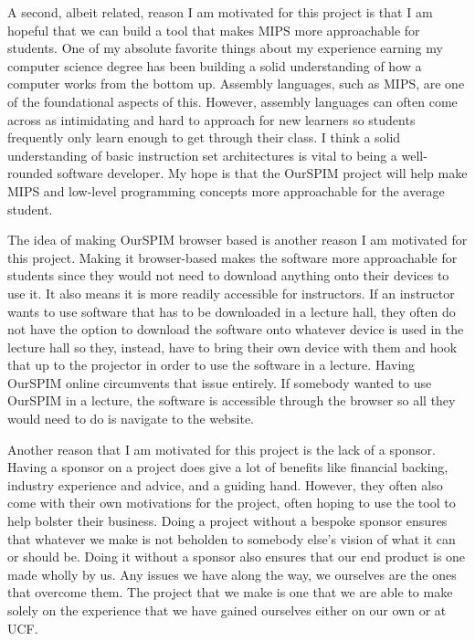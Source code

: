 \documentclass[parskip=half, fontsize=12pt]{scrartcl}
\begin{document}
A second, albeit related, reason I am motivated for this project is that I am hopeful that we can build a tool that makes MIPS more approachable for students. One of my absolute favorite things about my experience earning my computer science degree has been building a solid understanding of how a computer works from the bottom up. Assembly languages, such as MIPS, are one of the foundational aspects of this. However, assembly languages can often come across as intimidating and hard to approach for new learners so students frequently only learn enough to get through their class. I think a solid understanding of basic instruction set architectures is vital to being a well-rounded software developer. My hope is that the OurSPIM project will help make MIPS and low-level programming concepts more approachable for the average student.

The idea of making OurSPIM browser based is another reason I am motivated for this project. Making it browser-based makes the software more approachable for students since they would not need to download anything onto their devices to use it. It also means it is more readily accessible for instructors. If an instructor wants to use software that has to be downloaded in a lecture hall, they often do not have the option to download the software onto whatever device is used in the lecture hall so they, instead, have to bring their own device with them and hook that up to the projector in order to use the software in a lecture. Having OurSPIM online circumvents that issue entirely. If somebody wanted to use OurSPIM in a lecture, the software is accessible through the browser so all they would need to do is navigate to the website.

Another reason that I am motivated for this project is the lack of a sponsor. Having a sponsor on a project does give a lot of benefits like financial backing, industry experience and advice, and a guiding hand. However, they often also come with their own motivations for the project, often hoping to use the tool to help bolster their business. Doing a project without a bespoke sponsor ensures that whatever we make is not beholden to somebody else's vision of what it can or should be. Doing it without a sponsor also ensures that our end product is one made wholly by us. Any issues we have along the way, we ourselves are the ones that overcome them. The project that we make is one that we are able to make solely on the experience that we have gained ourselves either on our own or at UCF.
\end{document}
